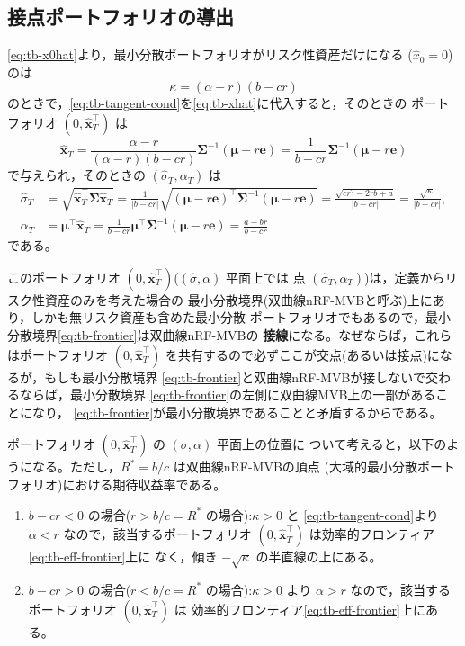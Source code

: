 \subsection{接点ポートフォリオの導出}

\eqref{eq:tb-x0hat}より，最小分散ポートフォリオがリスク性資産だけになる
($\hat x_0 = 0$)のは
\begin{equation}
\kappa = (\alpha - r)(b - cr)
\label{eq:tb-tangent-cond}
\end{equation}
のときで，\eqref{eq:tb-tangent-cond}を\eqref{eq:tb-xhat}に代入すると，そのときの
ポートフォリオ $(0, \hat{\bm{x}}_T^\top)$ は
\begin{equation}
\hat{\bm{x}}_T = \frac{\alpha-r}{(\alpha-r)(b-cr)}\bm{\Sigma}^{-1}(\bm{\mu}-r\bm{e})
= \frac{1}{b-cr}\bm{\Sigma}^{-1}(\bm{\mu}-r\bm{e})
\label{eq:tb-tangent}
\end{equation}
で与えられ，そのときの $(\hat\sigma_T, \alpha_T)$ は
\begin{align}
\hat\sigma_T &= \sqrt{\hat{\bm{x}}_T^\top\bm{\Sigma}\hat{\bm{x}}_T}
= \frac{1}{|b-cr|}\sqrt{(\bm{\mu}-r\bm{e})^\top\bm{\Sigma}^{-1}(\bm{\mu}-r\bm{e})}
= \frac{\sqrt{cr^2-2rb+a}}{|b-cr|} = \frac{\sqrt{\kappa}}{|b-cr|},\\
\alpha_T &= \bm{\mu}^\top\hat{\bm{x}}_T
= \frac{1}{b-cr}\bm{\mu}^\top\bm{\Sigma}^{-1}(\bm{\mu}-r\bm{e})
= \frac{a - br}{b - cr}
\end{align}
である。

このポートフォリオ $(0,\hat{\bm{x}}_T^\top)$($(\hat\sigma,\alpha)$ 平面上では
点 $(\hat\sigma_T,\alpha_T)$)は，定義からリスク性資産のみを考えた場合の
最小分散境界(双曲線nRF-MVBと呼ぶ)上にあり，しかも無リスク資産も含めた最小分散
ポートフォリオでもあるので，最小分散境界\eqref{eq:tb-frontier}は双曲線nRF-MVBの
\textbf{接線}になる。なぜならば，これらはポートフォリオ $(0,\hat{\bm{x}}_T^\top)$
を共有するので必ずここが交点(あるいは接点)になるが，もしも最小分散境界
\eqref{eq:tb-frontier}と双曲線nRF-MVBが接しないで交わるならば，最小分散境界
\eqref{eq:tb-frontier}の左側に双曲線MVB上の一部があることになり，
\eqref{eq:tb-frontier}が最小分散境界であることと矛盾するからである。

ポートフォリオ $(0,\hat{\bm{x}}_T^\top)$ の $(\sigma,\alpha)$ 平面上の位置に
ついて考えると，以下のようになる。ただし，$R^* = b/c$ は双曲線nRF-MVBの頂点
(大域的最小分散ポートフォリオ)における期待収益率である。
\begin{enumerate}
\item $b - cr < 0$ の場合($r > b/c = R^*$ の場合):$\kappa>0$ と
\eqref{eq:tb-tangent-cond}より $\alpha < r$ なので，該当するポートフォリオ
$(0,\hat{\bm{x}}_T^\top)$ は効率的フロンティア\eqref{eq:tb-eff-frontier}上に
なく，傾き $-\sqrt{\kappa}$ の半直線の上にある。
\item $b - cr > 0$ の場合($r < b/c = R^*$ の場合):$\kappa>0$ より
$\alpha > r$ なので，該当するポートフォリオ $(0,\hat{\bm{x}}_T^\top)$ は
効率的フロンティア\eqref{eq:tb-eff-frontier}上にある。
\end{enumerate}

